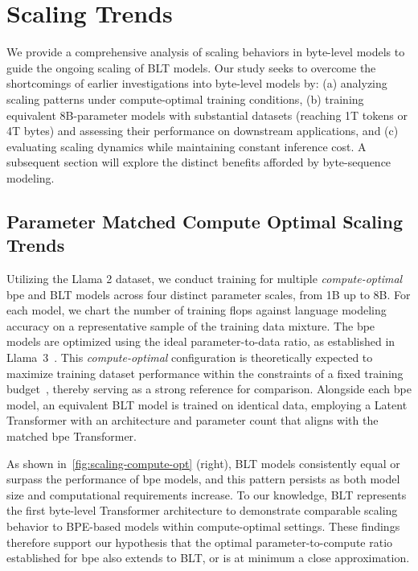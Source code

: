\section{Scaling Trends}
\label{section:scaling}

We provide a comprehensive analysis of scaling behaviors in byte-level models to guide the ongoing scaling of {\textsc BLT} models. Our study seeks to overcome the shortcomings of earlier investigations into byte-level models by: (a) analyzing scaling patterns under compute-optimal training conditions, (b) training equivalent 8B-parameter models with substantial datasets (reaching 1T tokens or 4T bytes) and assessing their performance on downstream applications, and (c) evaluating scaling dynamics while maintaining constant inference cost. A subsequent section will explore the distinct benefits afforded by byte-sequence modeling.

\subsection{Parameter Matched Compute Optimal Scaling Trends}
\label{section:parameter-matched-scaling}
Utilizing the Llama 2 dataset, we conduct training for multiple \textit{compute-optimal} bpe and {\textsc BLT} models across four distinct parameter scales, from 1B up to 8B. For each model, we chart the number of training flops against language modeling accuracy on a representative sample of the training data mixture. The bpe models are optimized using the ideal parameter-to-data ratio, as established in Llama~3~\citep{dubey2024llama}. This \textit{compute-optimal} configuration is theoretically expected to maximize training dataset performance within the constraints of a fixed training budget~\citep{hoffmann2022training}, thereby serving as a strong reference for comparison. Alongside each bpe model, an equivalent {\textsc BLT} model is trained on identical data, employing a Latent Transformer with an architecture and parameter count that aligns with the matched bpe Transformer.

As shown in~\autoref{fig:scaling-compute-opt} (right), {\textsc BLT} models consistently equal or surpass the performance of bpe models, and this pattern persists as both model size and computational requirements increase. To our knowledge, {\textsc BLT} represents the first byte-level Transformer architecture to demonstrate comparable scaling behavior to BPE-based models within compute-optimal settings. These findings therefore support our hypothesis that the optimal parameter-to-compute ratio established for bpe also extends to {\textsc BLT}, or is at minimum a close approximation.

